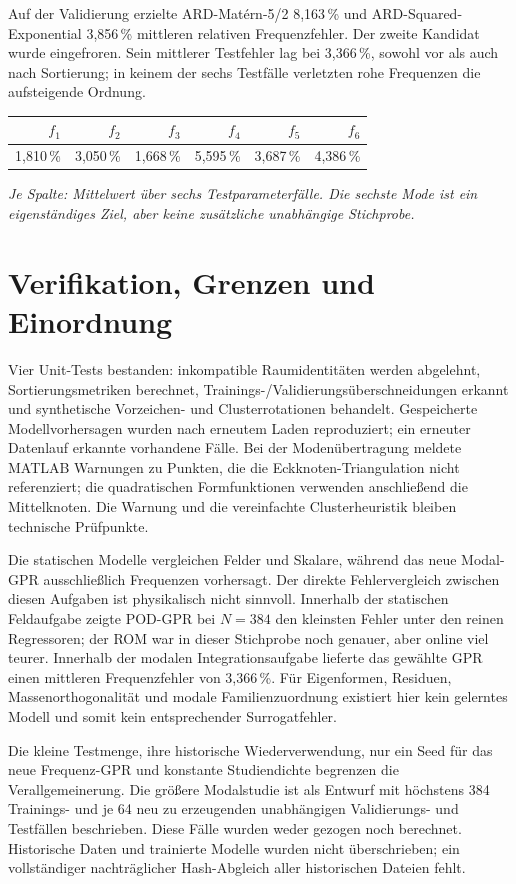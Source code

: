 \documentclass[11pt,a4paper]{article}
\begin{document}
Auf der Validierung erzielte ARD-Matérn-5/2 8,163\,\% und ARD-Squared-Exponential 3,856\,\% mittleren relativen Frequenzfehler. Der zweite Kandidat wurde eingefroren. Sein mittlerer Testfehler lag bei 3,366\,\%, sowohl vor als auch nach Sortierung; in keinem der sechs Testfälle verletzten rohe Frequenzen die aufsteigende Ordnung.
\begin{center}
\begin{tabular}{rrrrrr}
\toprule
$f_1$ & $f_2$ & $f_3$ & $f_4$ & $f_5$ & $f_6$\\
\midrule
1,810\,\% & 3,050\,\% & 1,668\,\% & 5,595\,\% & 3,687\,\% & 4,386\,\%\\
\bottomrule
\end{tabular}
\end{center}
\emph{Je Spalte: Mittelwert über sechs Testparameterfälle. Die sechste Mode ist ein eigenständiges Ziel, aber keine zusätzliche unabhängige Stichprobe.}

\section{Verifikation, Grenzen und Einordnung}
Vier Unit-Tests bestanden: inkompatible Raumidentitäten werden abgelehnt, Sortierungsmetriken berechnet, Trainings-/Validierungsüberschneidungen erkannt und synthetische Vorzeichen- und Clusterrotationen behandelt. Gespeicherte Modellvorhersagen wurden nach erneutem Laden reproduziert; ein erneuter Datenlauf erkannte vorhandene Fälle. Bei der Modenübertragung meldete MATLAB Warnungen zu Punkten, die die Eckknoten-Triangulation nicht referenziert; die quadratischen Formfunktionen verwenden anschließend die Mittelknoten. Die Warnung und die vereinfachte Clusterheuristik bleiben technische Prüfpunkte.

Die statischen Modelle vergleichen Felder und Skalare, während das neue Modal-GPR ausschließlich Frequenzen vorhersagt. Der direkte Fehlervergleich zwischen diesen Aufgaben ist physikalisch nicht sinnvoll. Innerhalb der statischen Feldaufgabe zeigte POD-GPR bei $N=384$ den kleinsten Fehler unter den reinen Regressoren; der ROM war in dieser Stichprobe noch genauer, aber online viel teurer. Innerhalb der modalen Integrationsaufgabe lieferte das gewählte GPR einen mittleren Frequenzfehler von 3,366\,\%. Für Eigenformen, Residuen, Massenorthogonalität und modale Familienzuordnung existiert hier kein gelerntes Modell und somit kein entsprechender Surrogatfehler.

Die kleine Testmenge, ihre historische Wiederverwendung, nur ein Seed für das neue Frequenz-GPR und konstante Studiendichte begrenzen die Verallgemeinerung. Die größere Modalstudie ist als Entwurf mit höchstens 384 Trainings- und je 64 neu zu erzeugenden unabhängigen Validierungs- und Testfällen beschrieben. Diese Fälle wurden weder gezogen noch berechnet. Historische Daten und trainierte Modelle wurden nicht überschrieben; ein vollständiger nachträglicher Hash-Abgleich aller historischen Dateien fehlt.
\end{document}
